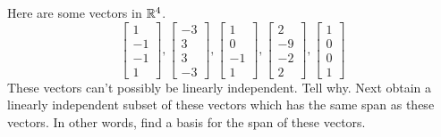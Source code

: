 \documentclass{ximera}
\begin{document}
\begin{problem}\label{prb:3.34} Here are some vectors in $\mathbb{R}^{4}$.
\begin{equation*}
\left[
\begin{array}{r}
1 \\
-1 \\
-1 \\
1
\end{array}
\right] ,\left[
\begin{array}{r}
-3 \\
3 \\
3 \\
-3
\end{array}
\right] ,\left[
\begin{array}{r}
1 \\
0 \\
-1 \\
1
\end{array}
\right] ,\left[
\begin{array}{r}
2 \\
-9 \\
-2 \\
2
\end{array}
\right] ,\left[
\begin{array}{r}
1 \\
0 \\
0 \\
1
\end{array}
\right]
\end{equation*}
These vectors can't possibly be linearly independent. Tell why. Next obtain a
linearly independent subset of these vectors which has the same span as
these vectors. In other words, find a basis for the span of these vectors.
\end{problem}
\end{document}
